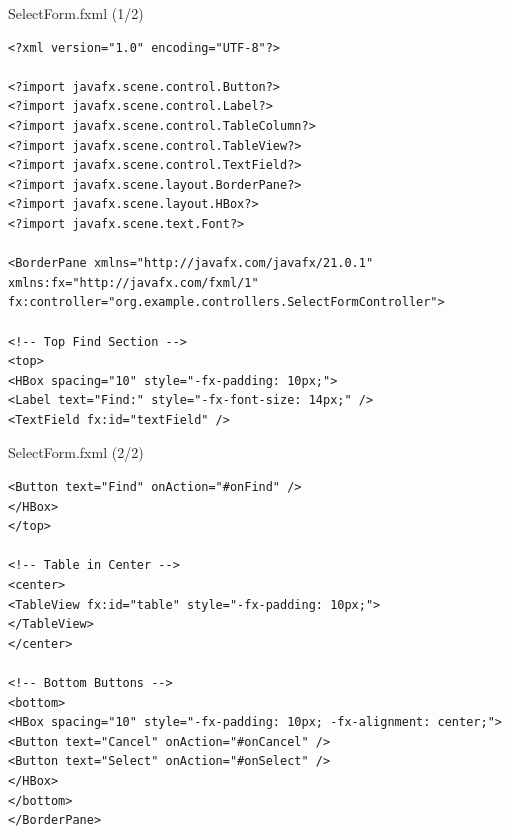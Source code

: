 \documentclass[aspectratio=169, table]{beamer}
\begin{document}
\begin{frame}[fragile]{SelectForm.fxml (1/2)}
\vspace{20pt}
\begin{lstlisting}[style=XmlStyle]
<?xml version="1.0" encoding="UTF-8"?>

<?import javafx.scene.control.Button?>
<?import javafx.scene.control.Label?>
<?import javafx.scene.control.TableColumn?>
<?import javafx.scene.control.TableView?>
<?import javafx.scene.control.TextField?>
<?import javafx.scene.layout.BorderPane?>
<?import javafx.scene.layout.HBox?>
<?import javafx.scene.text.Font?>

<BorderPane xmlns="http://javafx.com/javafx/21.0.1" 
xmlns:fx="http://javafx.com/fxml/1" 
fx:controller="org.example.controllers.SelectFormController">

<!-- Top Find Section -->
<top>
<HBox spacing="10" style="-fx-padding: 10px;">
<Label text="Find:" style="-fx-font-size: 14px;" />
<TextField fx:id="textField" />

\end{lstlisting}
\end{frame}

\begin{frame}[fragile]{SelectForm.fxml (2/2)}
\vspace{20pt}
\begin{lstlisting}[style=XmlStyle]
<Button text="Find" onAction="#onFind" />
</HBox>
</top>

<!-- Table in Center -->
<center>
<TableView fx:id="table" style="-fx-padding: 10px;">
</TableView>
</center>

<!-- Bottom Buttons -->
<bottom>
<HBox spacing="10" style="-fx-padding: 10px; -fx-alignment: center;">
<Button text="Cancel" onAction="#onCancel" />
<Button text="Select" onAction="#onSelect" />
</HBox>
</bottom>
</BorderPane>
\end{lstlisting}
\end{frame}
\end{document}
